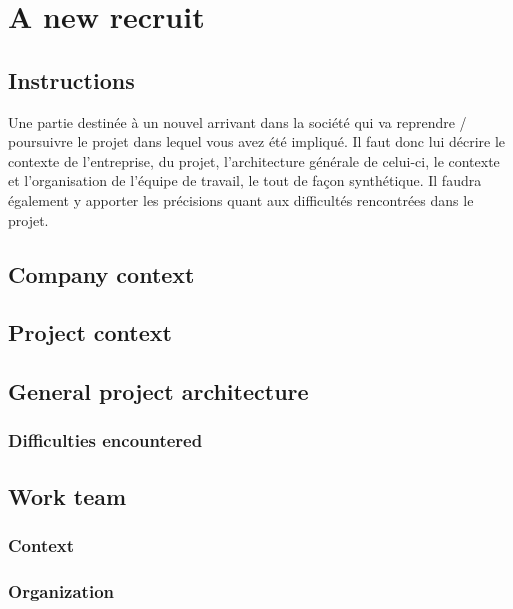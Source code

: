 \chapter{A new recruit}

\section{Instructions}
\color{red}
Une partie destinée à un nouvel arrivant dans la société qui va reprendre / poursuivre le projet dans lequel vous avez été impliqué. Il faut donc lui décrire le contexte de l’entreprise, du projet, l’architecture générale de celui-ci, le contexte et l’organisation de l’équipe de travail, le tout de façon synthétique. Il faudra également y apporter les précisions quant aux difficultés rencontrées dans le projet.
\color{black}

\clearpage

\section{Company context}

\section{Project context}

\section{General project architecture}
\subsection{Difficulties encountered}

\section{Work team}
\subsection{Context}
\subsection{Organization}

\clearpage
